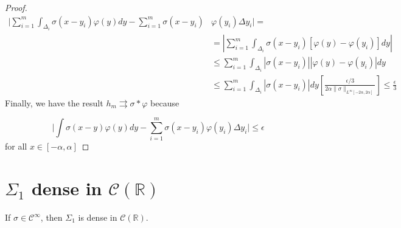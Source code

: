 \documentclass[../main.tex]{subfiles}
\begin{document}
\begin{proof}
\begin{equation*} 
	\begin{split}
		\Bigg| \sum_{i=1}^m \int_{\Delta_i} \sigma(x-y_i)\varphi(y)dy -  \sum_{i=1}^m \sigma(x-y_i)& \varphi(y_i)\Delta y_i \Bigg| =  \\
		& =  \left|  \sum_{i=1}^m \int_{\Delta_i} \sigma(x-y_i) [\varphi(y)-\varphi(y_i)] dy \right| \\
		& \leq  \sum_{i=1}^m \int_{\Delta_i}  \left| \sigma(x-y_i)\right| \left| \varphi(y) - \varphi(y_i)\right|dy  \\
		& \leq  \sum_{i=1}^m \int_{\Delta_i}  \left| \sigma(x-y_i)\right| dy \left[ \frac{\epsilon/3}{2\alpha \| \sigma\|_{L^\infty[-2\alpha,2\alpha]}}\right]  \leq \frac{\epsilon}{3} 
	\end{split}
\end{equation*}
Finally, we have the result $h_m \rightrightarrows \sigma \ast \varphi $ because

$$\Bigg| \int \sigma(x-y)\varphi(y)dy -  \sum_{i=1}^m \sigma(x-y_i) \varphi(y_i) \Delta y_i \Bigg| \leq \epsilon $$
for all $x\in [-\alpha,\alpha ]$
	\end{proof}
	
	\section{$\Sigma_1$ dense in $\mathcal{C}(\mathbb{R})$}
	\begin{lema} %
		If $\sigma \in \mathcal{C}^{\infty}$, then $ \Sigma_1$ is dense in  $\mathcal{C}(\mathbb{R})$.
	\end{lema}
	
\end{document}
